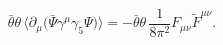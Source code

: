 \begin{equation}\label{Axial_Anomaly}
\bar\theta\theta\,
\langle \partial_\mu \Big(\bar\Psi \gamma^\mu\gamma_5\Psi\Big)\rangle
= - \bar\theta\theta\,\frac{1}{8\pi^2} F_{\mu\nu}\tilde F^{\mu\nu}.
\end{equation}

